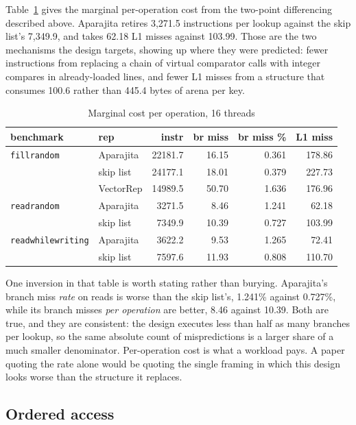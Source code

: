 \documentclass[conference]{IEEEtran}
\begin{document}
Table~\ref{tab:counters} gives the marginal per-operation cost from the two-point
differencing described above. Aparajita retires 3{,}271.5 instructions per lookup
against the skip list's 7{,}349.9, and takes 62.18 L1 misses against 103.99. Those
are the two mechanisms the design targets, showing up where they were predicted:
fewer instructions from replacing a chain of virtual comparator calls with integer
compares in already-loaded lines, and fewer L1 misses from a structure that
consumes 100.6 rather than 445.4 bytes of arena per key.

\begin{table}[t]
\caption{Marginal cost per operation, 16 threads}
\label{tab:counters}
\centering\footnotesize\setlength{\tabcolsep}{2.5pt}
\begin{tabular}{llrrrr}
\toprule
benchmark & rep & instr & br miss & br miss \% & L1 miss \\
\midrule
\texttt{fillrandom} & Aparajita & 22181.7 & 16.15 & 0.361 & 178.86 \\
                    & skip list & 24177.1 & 18.01 & 0.379 & 227.73 \\
                    & VectorRep & 14989.5 & 50.70 & 1.636 & 176.96 \\
\midrule
\texttt{readrandom} & Aparajita &  3271.5 &  8.46 & 1.241 &  62.18 \\
                    & skip list &  7349.9 & 10.39 & 0.727 & 103.99 \\
\midrule
\texttt{readwhilewriting} & Aparajita &  3622.2 &  9.53 & 1.265 &  72.41 \\
                          & skip list &  7597.6 & 11.93 & 0.808 & 110.70 \\
\bottomrule
\end{tabular}
\end{table}

One inversion in that table is worth stating rather than burying. Aparajita's
branch miss \emph{rate} on reads is worse than the skip list's, 1.241\% against
0.727\%, while its branch misses \emph{per operation} are better, 8.46 against
10.39. Both are true, and they are consistent: the design executes less than half
as many branches per lookup, so the same absolute count of mispredictions is a
larger share of a much smaller denominator. Per-operation cost is what a workload
pays. A paper quoting the rate alone would be quoting the single framing in which
this design looks worse than the structure it replaces.

\subsection{Ordered access}
\label{sec:seeks}
\end{document}

